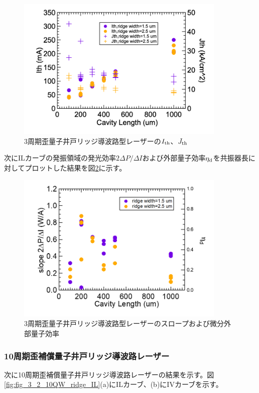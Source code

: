 {\begin{figure}[h]
	\centering
	\includegraphics[width=10cm]{figure/fig_3_2_3QW_ridge_Ith.png}
		\caption{3周期歪量子井戸リッジ導波路型レーザーの$I_{\rm{th}}$、$J_{\rm{th}}$}
		\label{fig:fig_3_2_3QW_ridge_Ith}
\end{figure}
次にILカーブの発振領域の発光効率$2 \Delta P/\Delta I$および外部量子効率$\eta_{\rm{d}}$を共振器長に対してプロットした結果を図\ref{fig:fig_3_2_3QW_ridge_slope}に示す。
\begin{figure}[h]
	\centering
	\includegraphics[width=10cm]{figure/fig_3_2_3QW_ridge_slope.png}
		\caption{3周期歪量子井戸リッジ導波路型レーザーのスロープおよび微分外部量子効率}
		\label{fig:fig_3_2_3QW_ridge_slope}
\end{figure}

\clearpage
\subsubsection{10周期歪補償量子井戸リッジ導波路レーザー}
次に10周期歪補償量子井戸リッジ導波路レーザーの結果を示す。図\ref{fig:fig_3_2_10QW_ridge_IL}(a)にILカーブ、(b)にIVカーブを示す。

}
